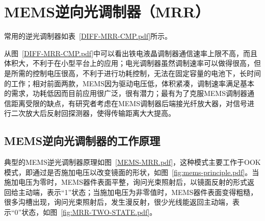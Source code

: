 \chapter{MEMS逆向光调制器（MRR）}
常用的逆光调制器如表~\ref{DIFF-MRR-CMP.pdf}所示。

从图~\ref{DIFF-MRR-CMP.pdf}中可以看出铁电液晶调制器通信速率上限不高，而且体积大，不利于在小型平台上的应用；电光调制器虽然调制速率可以做得很高，但是所需的控制电压很高，不利于进行功耗控制，无法在固定容量的电池下，长时间的工作；相对前面两款，MEMS因为驱动电压低，体积紧凑，调制速率满足基本的需求，功耗低因而目前应用很广泛，很有潜力；最有为了克服MEMS调制器通信距离受限的缺点，有研究者考虑在MEMS调制器后端接光纤放大器，对信号进行二次放大后反射回探测器，使得传输距离大大提高。



\section{MEMS逆向光调制器的工作原理}
典型的MEMS逆光调制器原理如图~\ref{MEMS-MRR.pdf}，这种模式主要工作于OOK模式，即通过是否施加电压以改变镜面的形状，如图~\ref{fig:mems-principle.pdf}。当施加电压为零时，MEMS器件表面平整，询问光束照射后，以镜面反射的形式返回给主动端，表示“1”状态；当施加电压为非零值时，MEMS器件表面变得粗糙，很多沟槽出现，询问光束照射后，发生漫反射，很少光线能返回主动端，表示“0”状态，如图~\ref{fig:MRR-TWO-STATE.pdf}。

